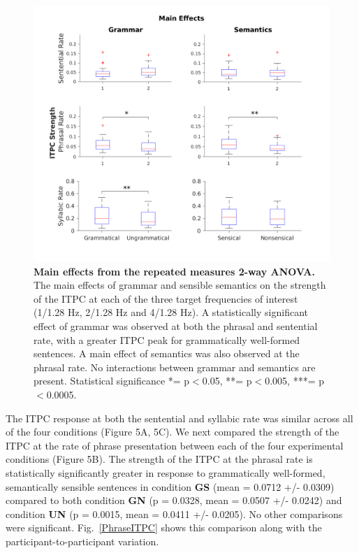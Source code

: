 \documentclass[a4paper,10pt,twoside]{article}
\begin{document}
\begin{figure}[tbhp]
\includegraphics[width=\linewidth]{BoxPlots_main_effects.png}
\caption{\textbf{Main effects from the repeated measures 2-way ANOVA.} The main effects of grammar and sensible semantics on the strength of the ITPC at each of the three target frequencies of interest (1/1.28 Hz, 2/1.28 Hz and 4/1.28 Hz). A statistically significant effect of grammar was observed at both the phrasal and sentential rate, with a greater ITPC peak for grammatically well-formed sentences. A main effect of semantics was also observed at the phrasal rate. No interactions between grammar and semantics are present. Statistical significance *= p$<$0.05, **= p$<$0.005, ***= p$<$0.0005.}
\label{MainEffects}
\end{figure}

The ITPC response at both the sentential and syllabic rate was similar across all of the four conditions (Figure 5A, 5C). We next compared the strength of the ITPC at the rate of phrase presentation between each of the four experimental conditions (Figure 5B). The strength of the ITPC at the phrasal rate is statistically significantly greater in response to grammatically well-formed, semantically sensible sentences in  condition \textbf{GS} (mean = 0.0712 +/- 0.0309) compared to both condition \textbf{GN} (p = 0.0328, mean = 0.0507 +/- 0.0242) and condition \textbf{UN} (p = 0.0015, mean = 0.0411 +/- 0.0205). No other comparisons were significant. Fig.~\ref{PhraseITPC} shows this comparison along with the participant-to-participant variation.
\end{document}
